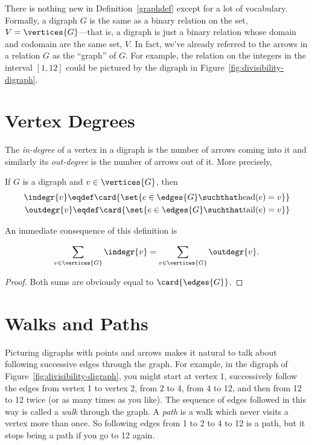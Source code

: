There is nothing new in Definition~\ref{graphdef} except for a lot of
vocabulary.  Formally, a digraph $G$ is the same as a binary relation
on the set, $V = \vertices{G}$---that is, a digraph is just a binary
relation whose domain and codomain are the same set, $V$.  In fact,
we've already referred to the arrows in a relation $G$ as the
``graph'' of $G$.  For example, the  relation on the
integers in the interval $[1,12]$ could be pictured by the digraph in
Figure~\ref{fig:divisibility-digraph}.

\section{Vertex Degrees}
The \emph{in-degree} of a vertex in a digraph is the number of arrows
coming into it and similarly its \emph{out-degree} is the number of
arrows out of it.  More precisely,
\begin{definition}\label{digraph-degree}
If $G$ is a digraph and $v \in \vertices{G}$, then
\begin{align*}
\indegr{v} \eqdef \card{\set{ e \in \edges{G} \suchthat \text{head}(e) = v}}\\
\outdegr{v} \eqdef \card{\set{ e \in \edges{G} \suchthat \text{tail}(e) = v}}\\
\end{align*}
\end{definition}

An immediate consequence of this definition is
\begin{lemma}\label{digraph-handshake}
\[
\sum_{v \in \vertices{G}} \indegr{v} = \sum_{v \in \vertices{G}} \outdegr{v}.
\]
\end{lemma}
\begin{proof}
Both sums are obviously equal to $\card{\edges{G}}$.
\end{proof}

\begin{problems}
\examproblems
{}
\end{problems}

\section{Walks and Paths}\label{sec:diwalks}
Picturing digraphs with points and arrows makes it natural to talk
about following successive edges through the graph.  For example, in
the digraph of Figure~\ref{fig:divisibility-digraph}, you might start
at vertex 1, successively follow the edges from vertex 1 to vertex 2,
from 2 to 4, from 4 to 12, and then from 12 to 12 twice (or as many
times as you like).  The sequence of edges followed in this way is
called a \emph{walk} through the graph.  A \emph{path} is a walk which
never visits a vertex more than once.  So following edges from 1 to 2
to 4 to 12 is a path, but it stops being a path if you go to 12 again.

